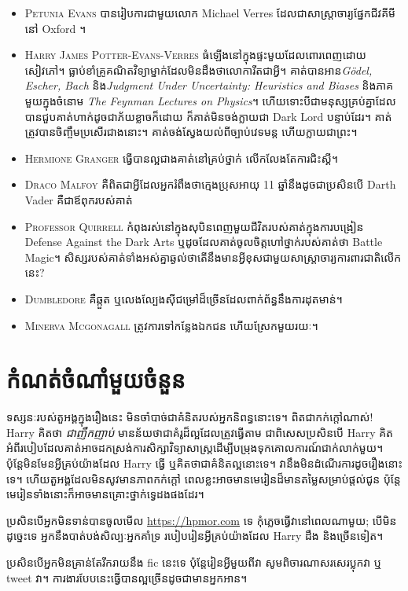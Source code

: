 \begin{itemize}
\item \textsc{Petunia Evans} បានរៀបការជាមួយលោក Michael Verres ដែលជាសាស្ត្រាចារ្យផ្នែកជីវគីមីនៅ Oxford ។
\item \textsc{Harry James Potter-Evans-Verres} ធំឡើងនៅក្នុងផ្ទះមួយដែលពោរពេញដោយសៀវភៅ។ ធ្លាប់​ខាំ​គ្រូ​គណិតវិទ្យា​ម្នាក់​ដែល​មិន​ដឹង​ថា​លោការីត​ជា​អ្វី។ គាត់បានអាន\emph{Gödel, Escher, Bach} និង\emph{Judgment Under Uncertainty: Heuristics and Biases} និងភាគមួយក្នុងចំនោម \emph{The Feynman Lectures on Physics}។ ហើយទោះបីជាមនុស្សគ្រប់គ្នាដែលបានជួបគាត់ហាក់ដូចជាភ័យខ្លាចក៏ដោយ ក៏គាត់មិនចង់ក្លាយជា Dark Lord បន្ទាប់ដែរ។ គាត់ត្រូវបានចិញ្ចឹមប្រសើរជាងនោះ។ គាត់ចង់ស្វែងយល់ពីច្បាប់វេទមន្ត ហើយក្លាយជាព្រះ។
\item \textsc{Hermione Granger} ធ្វើបានល្អជាងគាត់នៅគ្រប់ថ្នាក់ លើកលែងតែការជិះស្គី។
\item \textsc{Draco Malfoy} គឺពិតជាអ្វីដែលអ្នករំពឹងថាក្មេងប្រុសអាយុ 11 ឆ្នាំនឹងដូចជាប្រសិនបើ Darth Vader គឺជាឪពុករបស់គាត់
\item \textsc{Professor Quirrell} កំពុងរស់នៅក្នុងសុបិនពេញមួយជីវិតរបស់គាត់ក្នុងការបង្រៀន Defense Against the Dark Arts ឬដូចដែលគាត់ចូលចិត្តហៅថ្នាក់របស់គាត់ថា Battle Magic។ សិស្ស​របស់​គាត់​ទាំង​អស់​គ្នា​ឆ្ងល់​ថា​តើ​នឹង​មាន​អ្វី​ខុស​ជាមួយ​សាស្ត្រាចារ្យ​ការពារ​ជាតិ​លើក​នេះ?
\item \textsc{Dumbledore} គឺឆ្កួត ឬលេងល្បែងស៊ីជម្រៅដ៏ច្រើនដែលពាក់ព័ន្ធនឹងការដុតមាន់។
\item \textsc{Minerva Mcgonagall} ត្រូវការទៅកន្លែងឯកជន ហើយស្រែកមួយរយៈ។
\end{itemize}

%
%

\section*{កំណត់ចំណាំមួយចំនួន}
ទស្សនៈរបស់តួអង្គក្នុងរឿងនេះ មិនចាំបាច់ជាគំនិតរបស់អ្នកនិពន្ធនោះទេ។ ពិតជាកក់ក្តៅណាស់! Harry គិតថា \emph{ជាញឹកញាប់} មានន័យថាជាគំរូដ៏ល្អដែលត្រូវធ្វើតាម ជាពិសេសប្រសិនបើ Harry គិតអំពីរបៀបដែលគាត់អាចដកស្រង់ការសិក្សាវិទ្យាសាស្ត្រដើម្បីបម្រុងទុកគោលការណ៍ជាក់លាក់មួយ។ ប៉ុន្តែមិនមែនអ្វីគ្រប់យ៉ាងដែល Harry ធ្វើ ឬគិតថាជាគំនិតល្អនោះទេ។ វានឹងមិនដំណើរការដូចរឿងនោះទេ។ ហើយតួអង្គដែលមិនសូវមានភាពកក់ក្តៅ ពេលខ្លះអាចមានមេរៀនដ៏មានតម្លៃសម្រាប់ផ្តល់ជូន ប៉ុន្តែមេរៀនទាំងនោះក៏អាចមានគ្រោះថ្នាក់ទ្វេដងផងដែរ។

ប្រសិនបើអ្នកមិនទាន់បានចូលមើល \url{https://hpmor.com} ទេ កុំភ្លេចធ្វើវានៅពេលណាមួយ; បើមិនដូច្នេះទេ អ្នកនឹងបាត់បង់សិល្បៈអ្នកគាំទ្រ របៀបរៀនអ្វីគ្រប់យ៉ាងដែល Harry ដឹង និងច្រើនទៀត។

ប្រសិនបើអ្នកមិនគ្រាន់តែរីករាយនឹង fic នេះទេ ប៉ុន្តែរៀនអ្វីមួយពីវា សូមពិចារណាសរសេរប្លុកវា ឬ tweet វា។ ការងារ​បែប​នេះ​ធ្វើ​បាន​ល្អ​ច្រើន​ដូច​ជា​មាន​អ្នក​អាន។

